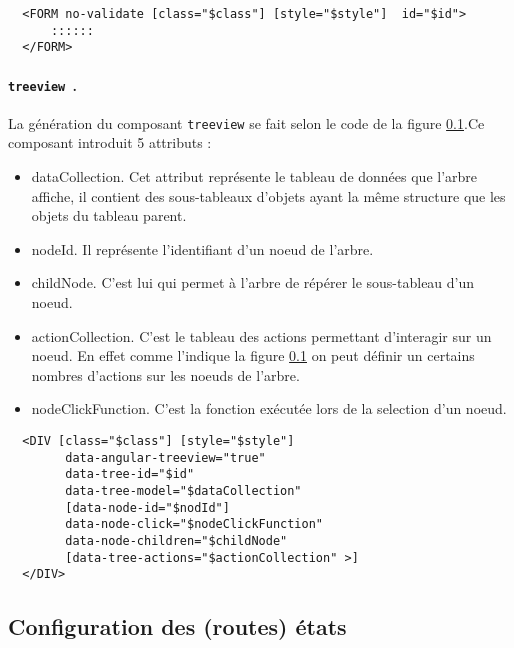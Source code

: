 \documentclass[a4paper,11pt]{report}
\begin{document}
\begin{verbatim}
  <FORM no-validate [class="$class"] [style="$style"]  id="$id">  
      ::::::
  </FORM>      
\end{verbatim}

\paragraph{{\tt treeview }.}La génération du composant {\tt treeview} se fait selon le code de la  figure \ref{}.Ce 
composant introduit 5 attributs : 

\begin{itemize}
 \item dataCollection. Cet attribut représente le tableau de données que  l'arbre affiche, il contient des sous-tableaux d'objets
 ayant la même structure que les objets du tableau parent.
 \item nodeId. Il représente l'identifiant d'un noeud de l'arbre.
 \item childNode. C'est lui qui permet à l'arbre de répérer le sous-tableau d'un noeud.
 \item actionCollection. C'est le tableau des actions permettant d'interagir sur un noeud. En effet comme l'indique la figure \ref{}
 on peut définir un certains nombres d'actions sur les noeuds de l'arbre.
 \item nodeClickFunction. C'est la fonction exécutée lors de la selection d'un noeud.
\end{itemize}

\begin{verbatim}
  <DIV [class="$class"] [style="$style"]  
	    data-angular-treeview="true"
	    data-tree-id="$id"
	    data-tree-model="$dataCollection"
	    [data-node-id="$nodId"]
	    data-node-click="$nodeClickFunction"
	    data-node-children="$childNode"
	    [data-tree-actions="$actionCollection" >]
  </DIV>
\end{verbatim}











\subsection{Configuration des (routes) états}
\end{document}
